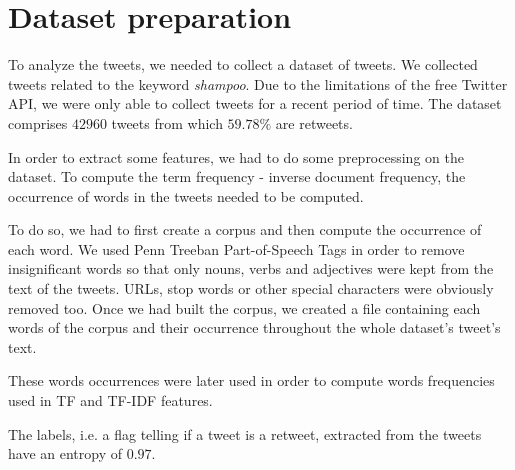 \section{Dataset preparation}
\label{sec:dataset}

To analyze the tweets, we needed to collect a dataset of tweets.
We collected tweets related to the keyword \textit{shampoo}. Due to the
limitations of the free Twitter API, we were only able to collect tweets for a
recent period of time. The dataset comprises $42960$ tweets from which 
$59.78\%$ are retweets.

In order to extract some features, we had to do some preprocessing on the
dataset. To compute the term frequency - inverse document frequency, the
occurrence of words in the tweets needed to be computed.

To do so, we had to first create a corpus and then compute the occurrence of
each word. We used Penn Treeban Part-of-Speech Tags in order to remove 
insignificant words so that only nouns, verbs and adjectives were kept from the 
text of the tweets. URLs, stop words or other special characters 
were obviously removed too. Once we had built the corpus, we created a file 
containing each words of the corpus and their occurrence throughout the whole 
dataset's tweet's text.

These words occurrences were later used in order to compute words frequencies 
used in TF and TF-IDF features.

The labels, i.e. a flag telling if a tweet is a retweet, extracted from the 
tweets have an entropy of $0.97$.